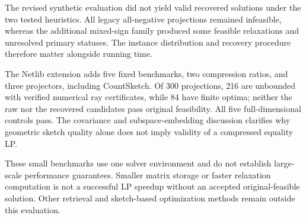 \documentclass[12pt,letterpaper,oneside]{report}
\theoremstyle{definition}
\begin{document}
The revised synthetic evaluation did not yield valid recovered solutions
under the two tested heuristics. All legacy all-negative projections
remained infeasible, whereas the additional mixed-sign family produced
some feasible relaxations and unresolved primary statuses. The instance
distribution and recovery procedure therefore matter alongside running time.

The Netlib extension adds five fixed benchmarks, two compression ratios,
and three projectors, including CountSketch. Of 300 projections, 216
are unbounded with verified numerical ray certificates, while 84 have
finite optima; neither the raw nor the recovered candidates pass original
feasibility. All five full-dimensional controls pass. The covariance
and subspace-embedding discussion clarifies why geometric sketch quality
alone does not imply validity of a compressed equality LP.

These small benchmarks use one solver environment and do not establish
large-scale performance guarantees. Smaller matrix storage or faster
relaxation computation is not a successful LP speedup without an accepted
original-feasible solution. Other retrieval and sketch-based optimization
methods remain outside this evaluation.
\end{document}
